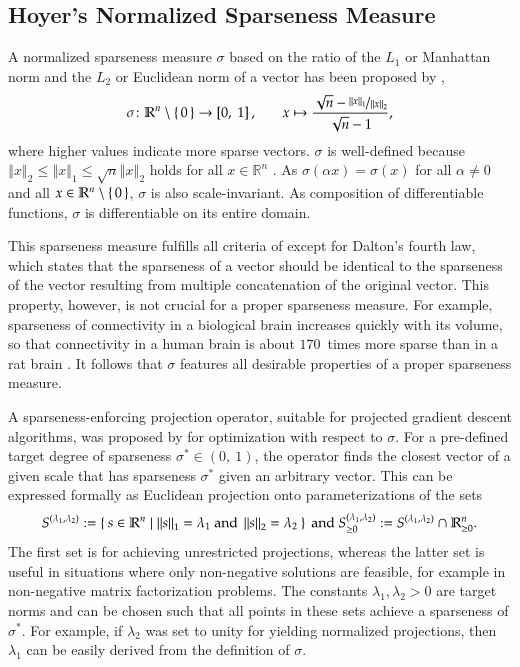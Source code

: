 \documentclass[twoside,11pt]{article}
\newcommand{\intervalcc}[2]{\left[#1,\ #2\right]}
\newcommand{\intervaloo}[2]{\left(#1,\ #2\right)}
\newcommand{\R}{\mathbb{R}}
\newcommand{\0}{\mathcal{O}}
\newcommand{\norm}[1]{\left\Vert#1\right\Vert}
\begin{document}
\subsection{Hoyer's Normalized Sparseness Measure}
\label{sect:intro_hoyer}
A normalized sparseness measure $\sigma$ based on the ratio of the $L_1$ or Manhattan norm and the $L_2$ or Euclidean norm of a vector has been proposed by \citet{Hoyer2004},
\begin{displaymath}
  \sigma\colon\R^n\setminus\set{0}\to\intervalcc{0}{1}\text{,}\qquad x\mapsto\frac{\sqrt{n} - \nicefrac{\norm{x}_1}{\norm{x}_2}}{\sqrt{n}-1}\text{,}
\end{displaymath}
where higher values indicate more sparse vectors.
$\sigma$ is well-defined because $\norm{x}_2 \leq \norm{x}_1 \leq \sqrt{n}\norm{x}_2$ holds for all $x\in\R^n$ \citep{Laub2004}.
As $\sigma(\alpha x) = \sigma(x)$ for all $\alpha \neq 0$ and all $x\in\R^n\setminus\set{0}$, $\sigma$ is also scale-invariant.
As composition of differentiable functions, $\sigma$ is differentiable on its entire domain.

This sparseness measure fulfills all criteria of \citet{Hurley2009} except for Dalton's fourth law, which states that the sparseness of a vector should be identical to the sparseness of the vector resulting from multiple concatenation of the original vector.
This property, however, is not crucial for a proper sparseness measure.
For example, sparseness of connectivity in a biological brain increases quickly with its volume, so that connectivity in a human brain is about $170$~times more sparse than in a rat brain \citep{Karbowski2003}.
It follows that $\sigma$ features all desirable properties of a proper sparseness measure.

A sparseness-enforcing projection operator, suitable for projected gradient descent algorithms, was proposed by \citet{Hoyer2004} for optimization with respect to $\sigma$.
For a pre-defined target degree of sparseness $\sigma^*\in\intervaloo{0}{1}$, the operator finds the closest vector of a given scale that has sparseness $\sigma^*$ given an arbitrary vector.
This can be expressed formally as Euclidean projection onto parameterizations of the sets
\begin{displaymath}
  S^{(\lambda_1,\lambda_2)} := \Set{s\in\R^n | \norm{s}_1 = \lambda_1\text{ and }\norm{s}_2 = \lambda_2}\text{ and }
  S_{\geq 0}^{(\lambda_1,\lambda_2)} := S^{(\lambda_1,\lambda_2)} \cap \R_{\geq 0}^n\text{.}
\end{displaymath}
The first set is for achieving unrestricted projections, whereas the latter set is useful in situations where only non-negative solutions are feasible, for example in non-negative matrix factorization problems.
The constants $\lambda_1, \lambda_2 > 0$ are target norms and can be chosen such that all points in these sets achieve a sparseness of $\sigma^*$.
For example, if $\lambda_2$ was set to unity for yielding normalized projections, then $\lambda_1$ can be easily derived from the definition of $\sigma$.
\end{document}
